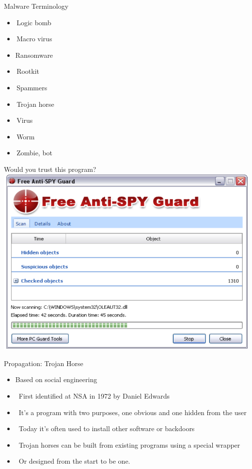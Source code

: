 \documentclass{beamer}
\begin{document}
\begin{frame}{Malware Terminology}
  \begin{itemize}
    \item Logic bomb 
    \item Macro virus
    \item Ransomware
    \item Rootkit 
    \item Spammers
    \item Trojan horse 
    \item Virus 
    \item Worm 
    \item Zombie, bot 
  \end{itemize}
\end{frame}


\begin{frame}{Would you trust this program?}
  \includegraphics[width=0.8\linewidth]{freeantispy}
\end{frame}

\begin{frame}{Propagation: Trojan Horse}
  \begin{itemize}
  \item  Based on social engineering
  \item  First identified at NSA in 1972 by Daniel 
    Edwards 
  \item  It's a program with two purposes, one obvious 
    and one hidden from the user 
  \item  Today it's often used to install other software or 
    backdoors 
  \item  Trojan horses can be built from existing 
    programs using a special wrapper 
  \item  Or designed from the start to be one.
  \end{itemize}
\end{frame}
\end{document}
